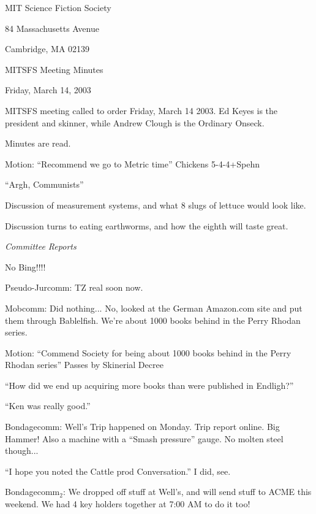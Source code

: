 \documentclass[12pt]{article}
\begin{document}
\begin{center}

MIT Science Fiction Society 

84 Massachusetts Avenue

Cambridge, MA 02139

\vspace{12pt}

MITSFS Meeting Minutes 

Friday, March 14, 2003

\end{center}
 
\vspace{18pt}

\setlength{\parskip}{6pt}

\noindent
MITSFS meeting called to order Friday, March 14 2003.  Ed Keyes is the president and skinner, while Andrew Clough is the Ordinary Onseck.

Minutes are read.

Motion:  ``Recommend we go to Metric time''  Chickens 5-4-4+Spehn

``Argh, Communists''

Discussion of measurement systems, and what 8 slugs of lettuce would look like.

Discussion turns to eating earthworms, and how the eighth will taste great.

{\em Committee Reports}

No Bing!!!!

Pseudo-Jurcomm:  TZ real soon now.

Mobcomm:  Did nothing...  No, looked at the German Amazon.com site and put them through Bablelfish.  We're about 1000 books behind in the Perry Rhodan series.

Motion: ``Commend Society for being about 1000 books behind in the Perry Rhodan series'' Passes by Skinerial Decree

``How did we end up acquiring more books than were published in Endligh?''

``Ken was really good.''

Bondagecomm:  Well's Trip happened on Monday.  Trip report online.  Big Hammer!  Also a machine with a ``Smash pressure'' gauge.  No molten steel though...

``I hope you noted the Cattle prod Conversation.''  I did, see.

Bondagecomm$_2$: We dropped off stuff at Well's, and will send stuff to ACME this weekend.  We had 4 key holders together at 7:00 AM to do it too!
\end{document}

